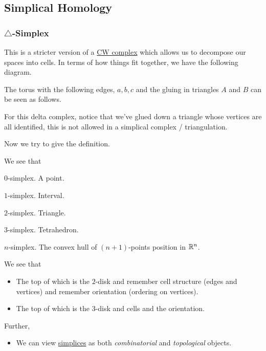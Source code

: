 \subsection{Simplical Homology}
\subsubsection{\(\triangle\)-Simplex}
This is a stricter version of a \hyperref[def:CW-Complex]{CW complex} which allows us to decompose our spaces into cells. In terms of how things fit together, we have
the following diagram.
\begin{figure}[H]
	\centering
	\label{fig:simplical-homology-venn-diagram}
\end{figure}

\begin{eg}
	The torus with the following edges, \(a, b, c\) and the gluing in triangles \(A\) and \(B\) can be seen as follows.
	\begin{figure}[H]
		\centering
		\label{fig:eg:constructing-torus-simplical}
	\end{figure}
	For this delta complex, notice that we've glued down a triangle whose vertices are all identified, this is not allowed in a simplical complex / triangulation.
\end{eg}

\hr

Now we try to give the definition.
\begin{definition}[Simplex]\label{def:simplex}
	We see that
	\begin{item}
	      \item \(0\)-simplex. A point.
	      \item \(1\)-simplex. Interval.
	      \item \(2\)-simplex. Triangle.
	      \item \(3\)-simplex. Tetrahedron.
	      \item \(n\)-simplex. The convex hull of \((n+1)\)-points position in \(\mathbb{\MakeUppercase{r}} ^n\).
	\end{item}
	\begin{figure}[H]
		\centering
		\label{fig:def:simplex}
	\end{figure}
\end{definition}
\begin{remark}
	We see that
	\begin{itemize}
		\item The top of which is the \(2\)-disk and remember cell structure (edges and vertices) and remember orientation (ordering on vertices).
		\item The top of which is the \(3\)-disk and cells and the orientation.
	\end{itemize}
	Further,
	\begin{itemize}
		\item We can view \hyperref[def:simplex]{simplices} as both \emph{combinatorial} and \emph{topological} objects.
	\end{itemize}
\end{remark}

